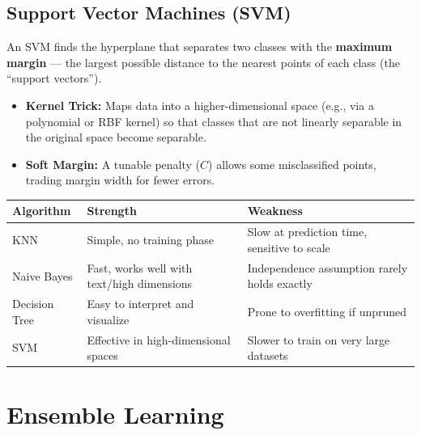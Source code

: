 \documentclass[11pt,a4paper]{article}
\begin{document}
\subsection{Support Vector Machines (SVM)}
\begin{definitionbox}
An SVM finds the hyperplane that separates two classes with the \textbf{maximum margin} --- the largest possible distance to the nearest points of each class (the ``support vectors'').
\end{definitionbox}
\begin{itemize}[leftmargin=*]
  \item \textbf{Kernel Trick:} Maps data into a higher-dimensional space (e.g., via a polynomial or RBF kernel) so that classes that are not linearly separable in the original space become separable.
  \item \textbf{Soft Margin:} A tunable penalty ($C$) allows some misclassified points, trading margin width for fewer errors.
\end{itemize}

\begin{conceptbox}
\begin{center}
\begin{tabular}{@{}p{2.4cm}p{4.6cm}p{4.9cm}@{}}
\toprule
\rowcolor{secondary!25}
\textbf{Algorithm} & \textbf{Strength} & \textbf{Weakness} \\
\midrule
KNN & Simple, no training phase & Slow at prediction time, sensitive to scale \\
Naive Bayes & Fast, works well with text/high dimensions & Independence assumption rarely holds exactly \\
Decision Tree & Easy to interpret and visualize & Prone to overfitting if unpruned \\
SVM & Effective in high-dimensional spaces & Slower to train on very large datasets \\
\bottomrule
\end{tabular}
\end{center}
\end{conceptbox}

\section{Ensemble Learning}
\end{document}
